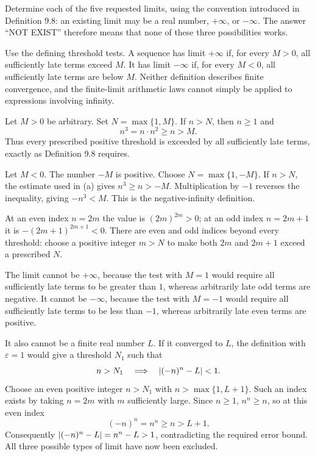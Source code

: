 
\goal Determine each of the five requested limits, using the
convention introduced in Definition 9.8: an existing limit may be
a real number, $+\infty$, or $-\infty$. The answer ``NOT EXIST''
therefore means that none of these three possibilities works.

\idea Use the defining threshold tests. A sequence has limit
$+\infty$ if, for every $M>0$, all sufficiently late terms exceed
$M$. It has limit $-\infty$ if, for every $M<0$, all sufficiently
late terms are below $M$. Neither definition describes finite
convergence, and the finite-limit arithmetic laws cannot simply
be applied to expressions involving infinity.

Let $M>0$ be arbitrary. Set $N=\max\{1,M\}$. If $n>N$, then
$n\geq1$ and
\[
 n^3=n\cdot n^2\geq n>M.
\]
Thus every prescribed positive threshold is exceeded by all
sufficiently late terms, exactly as Definition 9.8 requires.


Let $M<0$. The number $-M$ is positive. Choose
$N=\max\{1,-M\}$. If $n>N$, the estimate used in (a) gives
$n^3\geq n>-M$. Multiplication by $-1$ reverses the inequality,
giving $-n^3<M$. This is the negative-infinity definition.


At an even index $n=2m$ the value is $(2m)^{2m}>0$; at an
odd index $n=2m+1$ it is $-(2m+1)^{2m+1}<0$.
There are even and odd indices beyond every threshold: choose
a positive integer $m>N$ to make both $2m$ and $2m+1$ exceed
a prescribed $N$.

The limit cannot be $+\infty$, because the test with $M=1$
would require all sufficiently late terms to be greater than $1$,
whereas arbitrarily late odd terms are negative. It cannot be
$-\infty$, because the test with $M=-1$ would require all
sufficiently late terms to be less than $-1$, whereas arbitrarily
late even terms are positive.

It also cannot be a finite real number $L$. If it converged to
$L$, the definition with $\varepsilon=1$ would give a threshold
$N_1$ such that
\[
 n>N_1\quad\Longrightarrow\quad\left|(-n)^n-L\right|<1.
\]
Choose an even positive integer $n>N_1$ with
$n>\max\{1,L+1\}$. Such an index exists by taking $n=2m$
with $m$ sufficiently large. Since $n\geq1$, $n^n\geq n$,
so at this even index
\[
 (-n)^n=n^n\geq n>L+1.
\]
Consequently $\left|(-n)^n-L\right|=n^n-L>1$, contradicting the
required error bound. All three possible types of limit have
now been excluded.

